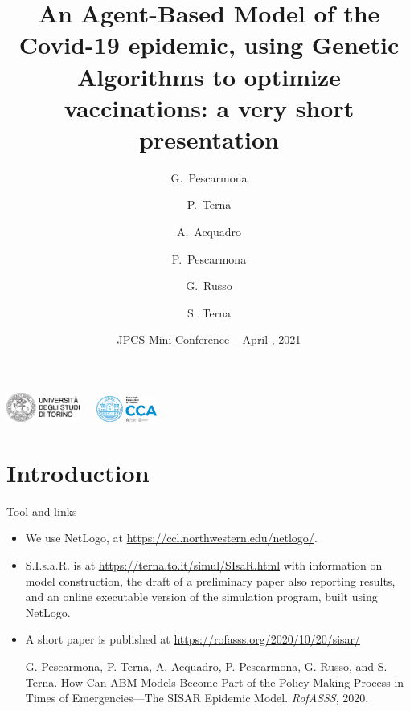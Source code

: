 \documentclass[8pt]{beamer}
\title[S.I.s.a.R. Model] %
{An Agent-Based Model of the Covid-19 epidemic, using Genetic Algorithms to optimize vaccinations: a very short presentation}
\author[] %
{G.~Pescarmona\inst{1} \and P.~Terna\inst{2} \and A.~Acquadro\inst{1} \and P.~Pescarmona\inst{3} \and G.~Russo\inst{4}  
\and S.~Terna\inst{5}  }
\institute[] %
{
  \inst{1}%
 University of Torino, Italy
  \and
  \inst{2}%
  University of Torino, Italy, retired \& Fondazione Collegio Carlo Alberto, Honorary Fellow, Italy
 \and
  \inst{3}%
  University of Groningen, The Netherlands  
  \and
  \inst{4}%
  Centro Einaudi, Torino, Italy
  \and
  \inst{5}%
 tomorrowdata.io
  }
\date[] %
{JPCS Mini-Conference -- April \nth{10}, 2021}
\begin{document}
\begin{frame}

\includegraphics[width=0.18\textwidth]{logo_unito.png}~~~\includegraphics[width=0.15\textwidth]{CCA_Logo.png}

  \titlepage
\end{frame}

\section{Introduction}
\begin{frame}{Tool and links}

  \begin{itemize}

\item We use NetLogo, at \url{https://ccl.northwestern.edu/netlogo/}.

 \medskip
 
 \item
 
S.I.s.a.R. is at \url{https://terna.to.it/simul/SIsaR.html} with information on model construction, the draft of a preliminary paper also reporting results, and an online executable version of the simulation program, built using NetLogo.

 \medskip
 
 \item
 A short paper is published at \url{https://rofasss.org/2020/10/20/sisar/}
 
 \medskip
 
 G. Pescarmona, P. Terna, A. Acquadro, P. Pescarmona, G. Russo, and S. Terna. How Can ABM Models Become Part of the Policy-Making Process in Times of Emergencies---The SISAR Epidemic Model. \emph{RofASSS}, 2020.

 \end{itemize}
\end{frame}
\end{document}
